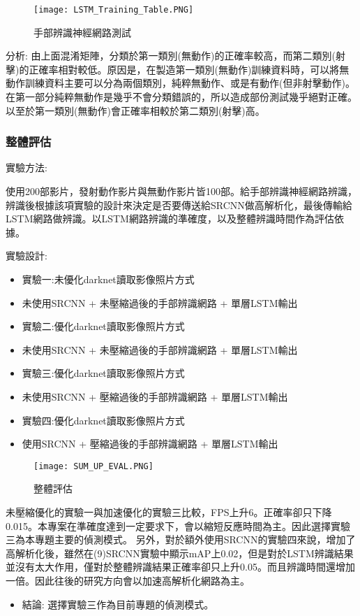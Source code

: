 \begin{figure}[H]
    \centering
    \texttt{[image: LSTM\_Training\_Table.PNG]}
    \caption{手部辨識神經網路測試}
    \label{fig:手部辨識神經網路測試}
\end{figure}

分析:
由上面混淆矩陣，分類於第一類別(無動作)的正確率較高，而第二類別(射擊)的正確率相對較低。原因是，在製造第一類別(無動作)訓練資料時，可以將無動作訓練資料主要可以分為兩個類別，純粹無動作、或是有動作(但非射擊動作)。在第一部分純粹無動作是幾乎不會分類錯誤的，所以造成部份測試幾乎絕對正確。以至於第一類別(無動作)會正確率相較於第二類別(射擊)高。


\subsubsection{整體評估}
實驗方法:

使用200部影片，發射動作影片與無動作影片皆100部。給手部辨識神經網路辨識，辨識後根據該項實驗的設計來決定是否要傳送給SRCNN做高解析化，最後傳輸給LSTM網路做辨識。以LSTM網路辨識的準確度，以及整體辨識時間作為評估依據。

實驗設計:
\begin{itemize}
\item 實驗一:未優化darknet讀取影像照片方式
\item 未使用SRCNN + 未壓縮過後的手部辨識網路 + 單層LSTM輸出
\item 實驗二:優化darknet讀取影像照片方式
\item 未使用SRCNN + 未壓縮過後的手部辨識網路 + 單層LSTM輸出
\item 實驗三:優化darknet讀取影像照片方式
\item 未使用SRCNN + 壓縮過後的手部辨識網路 + 單層LSTM輸出
\item 實驗四:優化darknet讀取影像照片方式
\item 使用SRCNN + 壓縮過後的手部辨識網路 + 單層LSTM輸出
\end{itemize}

\begin{figure}[H]
    \centering
    \texttt{[image: SUM\_UP\_EVAL.PNG]}
    \caption{整體評估}
    \label{fig:整體評估}
\end{figure}


未壓縮優化的實驗一與加速優化的實驗三比較，FPS上升6。正確率卻只下降0.015。本專案在準確度達到一定要求下，會以縮短反應時間為主。因此選擇實驗三為本專題主要的偵測模式。
另外，對於額外使用SRCNN的實驗四來說，增加了高解析化後，雖然在(9)SRCNN實驗中顯示mAP上0.02，但是對於LSTM辨識結果並沒有太大作用，僅對於整體辨識結果正確率卻只上升0.05。而且辨識時間還增加一倍。因此往後的研究方向會以加速高解析化網路為主。

\begin{itemize}
\item 結論: 選擇實驗三作為目前專題的偵測模式。
\end{itemize}
